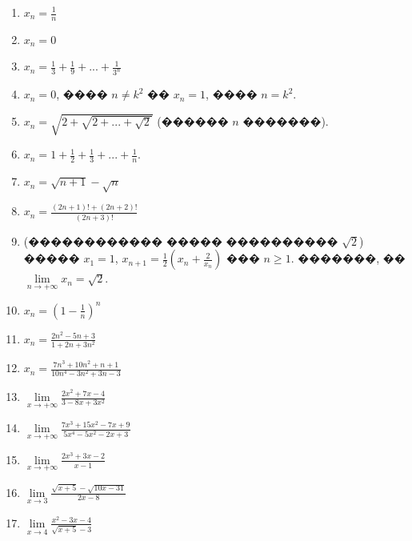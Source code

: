\documentclass[a4paper,12pt]{article}
\begin{document}
\begin{enumerate}
\item $x_{n}=\frac{1}{n}$

\item $x_{n}=0$

\item $x_{n}=\frac{1}{3}+\frac{1}{9}+...+\frac{1}{3^{n}}$

\item $x_{n}=0$, ���� $n\neq k^{2}$ �� $x_{n}=1$, ���� $n=k^{2}$.

\item $x_{n}=\sqrt{2+\sqrt{2+...+\sqrt{2}}}$ (������ $n$ �������).

\item $x_{n}=1+\frac{1}{2}+\frac{1}{3}+...+\frac{1}{n}$.

\item $x_{n}=\sqrt{n+1}-\sqrt{n}$

\item $x_{n}=\frac{(2n+1)!+(2n+2)!}{(2n+3)!}$

\item (������������ ����� ���������� $\sqrt{2}$) ����� $x_{1}=1$, $x_{n+1}=\frac{1}{2}(x_{n}+\frac{2}{x_{n}})$ ��� $n\geq 1$. �������, �� $\lim\limits_{n\rightarrow +\infty}^{}x_{n}=\sqrt{2}$.

\item $x_{n}=(1-\frac{1}{n})^{n}$

\item $x_{n}=\frac{2n^{2}-5n+3}{1+2n+3n^{2}}$

\item $x_{n}=\frac{7n^{3}+10n^{2}+n+1}{10n^{4}-3n^{2}+3n-3}$

\item $\lim\limits_{x\rightarrow +\infty}^{}\frac{2x^{2}+7x-4}{3-8x+3x^{2}}$

\item $\lim\limits_{x\rightarrow +\infty}^{}\frac{7x^{3}+15x^{2}-7x+9}{5x^{4}-5x^{2}-2x+3}$

\item $\lim\limits_{x\rightarrow +\infty}^{}\frac{2x^{3}+3x-2}{x-1}$

\item $\lim\limits_{x\rightarrow 3}^{}\frac{\sqrt{x+5}-\sqrt{10x-31}}{2x-8}$

\item $\lim\limits_{x\rightarrow 4}^{}\frac{x^{2}-3x-4}{\sqrt{x+5}-3}$
\end{enumerate}
\end{document}
